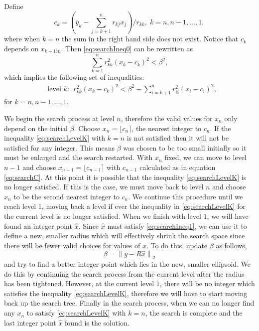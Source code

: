 \documentclass[12pt,Bold,letterpaper]{mcgilletdclass}
\begin{document}
Define
\begin{equation}
 c_k = (\bar{y}_k - \sum_{j=k+1}^nr_{kj}x_j)/r_{kk}, \; k=n, n-1,\ldots, 1,
\label{eq:searchC}
\end{equation}
where when $k=n$ the sum in the right hand side does not exist. Notice that $c_k$ depends on $x_{k+1:n}$.
Then \eqref{eq:searchIneq0} can be rewritten as
\begin{equation}\label{eq:searchIneq1}
\sum_{k=1}^n r_{kk}^2(x_k-c_k)^2 < \beta^2,
\end{equation}
which implies the following
set of inequalities:
\begin{align}
&\text{level } k: \ \ r_{kk}^2(x_k-c_k)^2 < \beta^2 -\sum_{i=k+1}^nr_{ii}^2(x_i-c_i)^2, \label{eq:searchLevelK}
\end{align}
for $k=n,n-1,\ldots, 1$.

We begin the search process
at level $n$, therefore the valid values for $x_n$ only depend on the initial $\beta$. Choose $x_n = \lfloor c_n \rceil$, the nearest integer to $c_n$. If the inequality \eqref{eq:searchLevelK} with $k=n$
is not satisfied then it will not be satisfied for any integer. This means $\beta$
was chosen to be too small initially so it must be enlarged and the search restarted. With $x_n$ fixed, we can move
to level $n-1$ and choose $x_{n-1} = \lfloor c_{n-1} \rceil$ with $c_{n-1}$ calculated as in equation \eqref{eq:searchC}. At this point it is possible that the inequality \eqref{eq:searchLevelK} is no longer satisfied. If this is the case, we must move back to level $n$ and choose $x_n$ to be the second nearest integer to $c_n$.  We continue this procedure until we reach
level 1, moving back a level if ever the inequality in \eqref{eq:searchLevelK} for the current level is no longer satisfied. When we finish with level $1$, we will have found an integer point $\hat{x}$. Since $\hat{x}$ must satisfy \eqref{eq:searchIneq1}, we can use it to define a new, smaller radius which will effectively shrink the search space since there will be fewer valid choices for values of $x$.  To do this, update $\beta$ as follows, $$\beta = \left \| \bar{y} - R\hat{x} \right \|_2$$ and try to find a better integer point which lies in the new, smaller ellipsoid. We do this by continuing the search process from the current level after the radius has been tightened. However, at the current level $1$, there will be no integer which satisfies the inequality \eqref{eq:searchLevelK}, therefore we will have to start moving back up the search tree. Finally in the search process, when we can no longer find any $x_n$ to satisfy \eqref{eq:searchLevelK} with $k=n$, the search is complete and the last integer point $\hat{x}$ found is the solution.
\end{document}
